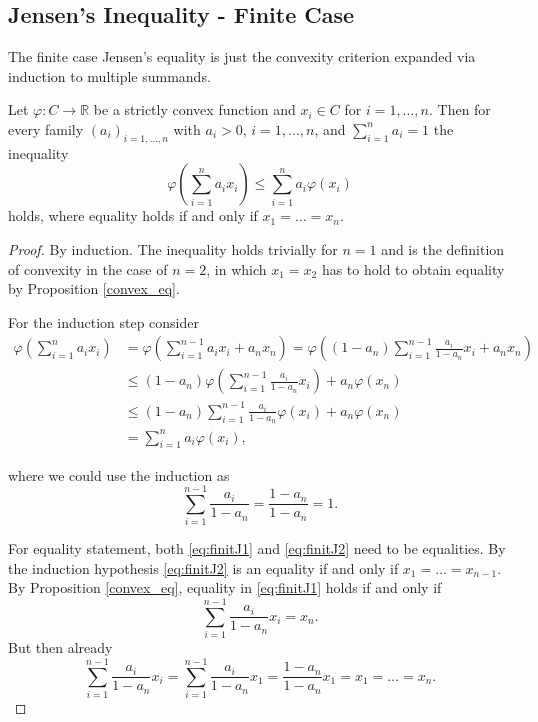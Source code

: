
\subsection{Jensen's Inequality - Finite Case}

The finite case Jensen's equality is just the convexity criterion expanded via induction to multiple summands.

\begin{proposition}
  Let $\varphi: C \to \mathbb{R}$ be a strictly convex function and $x_i \in C$ for $i=1,\dots,n$. Then for every family $(a_i)_{i=1,...,n}$ with $a_i > 0$, $i=1,\dots,n$, and $\sum_{i=1}^{n} a_i = 1$ the inequality
  \[
  \varphi\left(\sum_{i=1}^{n} a_i x_i\right) \leq \sum_{i=1}^{n} a_i \varphi(x_i)
  \]
  holds, where equality holds if and only if $x_1 = \ldots = x_n$.
\end{proposition}

\begin{proof}
  By induction. The inequality holds trivially for $n=1$ and is the definition of convexity in the case of $n=2$, in which $x_1 = x_2$ has to hold to obtain equality by Proposition \ref{convex_eq}.

  For the induction step consider
  \begin{align}
    \varphi\left(\sum_{i=1}^{n} a_i x_i\right) &= \varphi\left( \sum_{i=1}^{n-1} a_ix_i + a_n x_n \right) = \varphi\left( (1-a_n) \sum_{i=1}^{n-1} \frac{a_i}{1-a_n}x_i + a_n x_n \right) \nonumber \\
    & \leq (1-a_n) \varphi\left( \sum_{i=1}^{n-1} \frac{a_i}{1-a_n} x_i
    \right) + a_n \varphi(x_n) \label{eq:finitJ1} \\ & \leq (1 - a_n) \sum_{i=1}^{n-1}  \frac{a_i}{1-a_n} \varphi(x_i) + a_n \varphi(x_n) \label{eq:finitJ2} \\
     &= \sum_{i=1}^{n} a_i \varphi(x_i), \nonumber
  \end{align}

  where we could use the induction as
  \[
  \sum_{i=1}^{n-1}  \frac{a_i}{1-a_n} = \frac{1-a_n}{1-a_n} = 1.
  \]

  For equality statement, both \ref{eq:finitJ1} and \ref{eq:finitJ2} need to be equalities. By the induction hypothesis \ref{eq:finitJ2} is an equality if and only if $x_1 = \ldots = x_{n-1}$.  By Proposition \ref{convex_eq}, equality in \ref{eq:finitJ1} holds if and only if
  \[
  \sum_{i=1}^{n-1} \frac{a_i}{1-a_n} x_i = x_n.
  \]
  But then already
  \[
  \sum_{i=1}^{n-1} \frac{a_i}{1-a_n} x_i = \sum_{i=1}^{n-1} \frac{a_i}{1-a_n} x_1 = \frac{1-a_n}{1-a_n} x_1 = x_1 = \ldots = x_n.
  \]
  
\end{proof}
